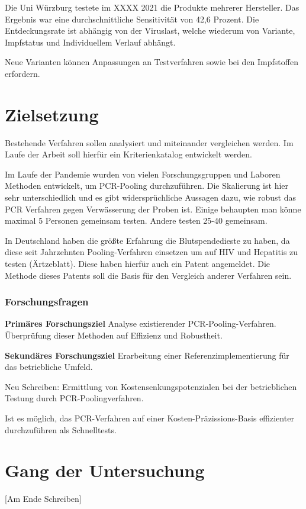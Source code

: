 Die Uni Würzburg testete im XXXX 2021 die Produkte mehrerer Hersteller.
Das Ergebnis war eine durchschnittliche Sensitivität von 42,6 Prozent.
Die Entdeckungsrate ist abhängig von der Viruslast, welche wiederum von Variante, Impfstatus und Individuellem Verlauf abhängt.

Neue Varianten können Anpassungen an Testverfahren sowie bei den Impfstoffen erfordern.

\section{Zielsetzung}
Bestehende Verfahren sollen analysiert und miteinander vergleichen werden.
Im Laufe der Arbeit soll hierfür ein Kriterienkatalog entwickelt werden.

Im Laufe der Pandemie wurden von vielen Forschungsgruppen und Laboren Methoden entwickelt, um PCR-Pooling durchzuführen. Die Skalierung ist hier sehr unterschiedlich und es gibt widersprüchliche Aussagen dazu, wie robust das PCR Verfahren gegen Verwässerung der Proben ist. Einige behaupten man könne maximal 5 Personen gemeinsam testen. Andere testen 25-40 gemeinsam.

In Deutschland haben die größte Erfahrung die Blutspendedieste zu haben, da diese seit Jahrzehnten Pooling-Verfahren einsetzen um auf HIV und Hepatitis zu testen (Ärtzeblatt). Diese haben hierfür auch ein Patent angemeldet. Die Methode dieses Patents soll die Basis für den Vergleich anderer Verfahren sein.

\subsubsection{Forschungsfragen}
\textbf{Primäres Forschungsziel}\newline
Analyse existierender PCR-Pooling-Verfahren.\newline
Überprüfung dieser Methoden auf Effizienz und Robustheit.

\textbf{Sekundäres Forschungsziel}\newline 
Erarbeitung einer Referenzimplementierung für das betriebliche Umfeld.\newline

Neu Schreiben:
Ermittlung von Kostensenkungspotenzialen bei der betrieblichen Testung durch PCR-Poolingverfahren.

Ist es möglich, das PCR-Verfahren auf einer Kosten-Präzissions-Basis effizienter durchzuführen als Schnelltests.

\section{Gang der Untersuchung}
[Am Ende Schreiben]

